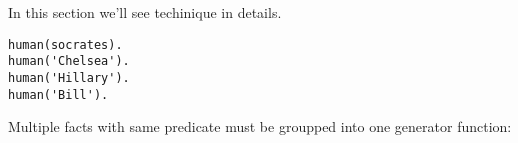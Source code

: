 \label{yield}

In this section we'll see \href{http://yieldprolog.sourceforge.net/}{\yp}
techinique in details.

\begin{verbatim}
human(socrates).
human('Chelsea').
human('Hillary').
human('Bill').
\end{verbatim}

Multiple facts with same predicate must be groupped into one generator function: 



